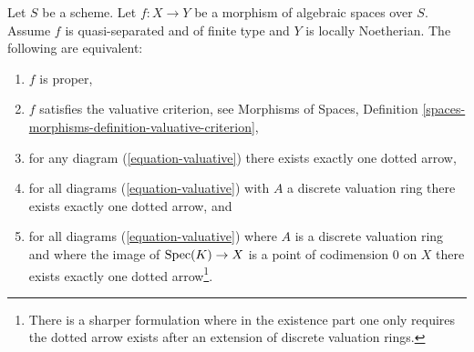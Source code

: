 \begin{lemma}
\label{lemma-Noetherian-dvr-valuative-proper}
Let $S$ be a scheme. Let $f : X \to Y$ be a morphism of algebraic spaces
over $S$. Assume $f$ is quasi-separated and of finite type and $Y$
is locally Noetherian. The following are equivalent:
\begin{enumerate}
\item $f$ is proper,
\item $f$ satisfies the valuative criterion, see
Morphisms of Spaces, Definition
\ref{spaces-morphisms-definition-valuative-criterion},
\item for any diagram (\ref{equation-valuative}) there exists exactly
one dotted arrow,
\item for all diagrams (\ref{equation-valuative}) with $A$ a discrete
valuation ring there exists exactly one dotted arrow, and
\item for all diagrams (\ref{equation-valuative}) where $A$ is a discrete
valuation ring and where the image of $\mathop{\mathrm{Spec}}(K) \to X$ is a point of
codimension $0$ on $X$ there exists exactly one dotted arrow\footnote{There is
a sharper formulation where in the existence part one only requires
the dotted arrow exists after an extension of discrete valuation rings.}.
\end{enumerate}
\end{lemma}

